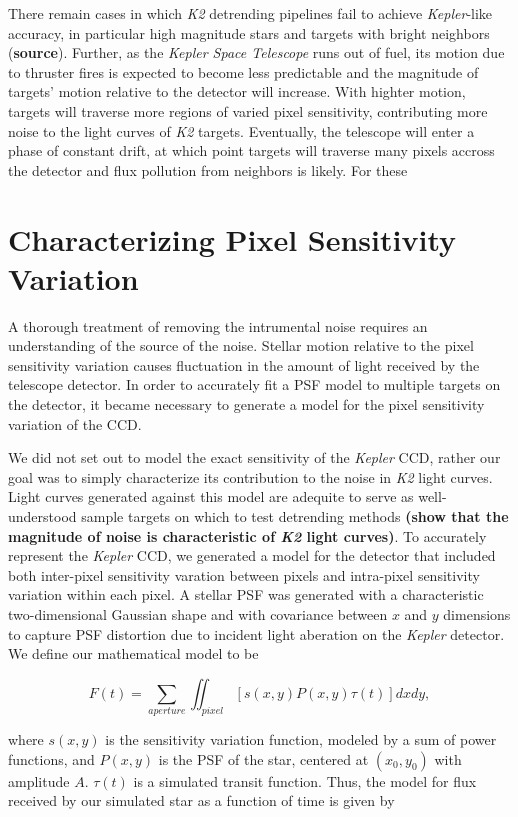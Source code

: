\documentclass[12pt,preprint]{aastex}
\begin{document}
There remain cases in which \textit{K2} detrending pipelines fail to achieve \textit{Kepler}-like accuracy, in particular high magnitude stars and targets with bright neighbors (\textbf{source}). Further, as the \textit{Kepler Space Telescope} runs out of fuel, its motion due to thruster fires is expected to become less predictable and the magnitude of targets' motion relative to the detector will increase. With highter motion, targets will traverse more regions of varied pixel sensitivity, contributing more noise to the light curves of \textit{K2} targets. Eventually, the telescope will enter a phase of constant drift, at which point targets will traverse many pixels accross the detector and flux pollution from neighbors is likely. For these

\section{Characterizing Pixel Sensitivity Variation}

A thorough treatment of removing the intrumental noise requires an understanding of the source of the noise. Stellar motion relative to the pixel sensitivity variation causes fluctuation in the amount of light received by the telescope detector. In order to accurately fit a PSF model to multiple targets on the detector, it became necessary to generate a model for the pixel sensitivity variation of the CCD.

We did not set out to model the exact sensitivity of the \textit{Kepler} CCD, rather our goal was to simply characterize its contribution to the noise in \textit{K2} light curves. Light curves generated against this model are adequite to serve as well-understood sample targets on which to test detrending methods \textbf{(show that the magnitude of noise is characteristic of \textit{K2} light curves)}. To accurately represent the \textit{Kepler} CCD, we generated a model for the detector that included both inter-pixel sensitivity varation between pixels and intra-pixel sensitivity variation within each pixel. A stellar PSF was generated with a characteristic two-dimensional Gaussian shape and with covariance between $x$ and $y$ dimensions to capture PSF distortion due to incident light aberation on the \textit{Kepler} detector. We define our mathematical model to be

\[
F(t) = \sum_{aperture} \iint_{pixel} [s(x,y)P(x,y)\tau(t)] dxdy,
\]

where $s(x,y)$ is the sensitivity variation function, modeled by a sum of power functions, and $P(x,y)$ is the PSF of the star, centered at $(x_0,y_0)$ with amplitude $A$. $\tau (t)$ is a simulated transit function. Thus, the model for flux received by our simulated star as a function of time is given by
\end{document}
